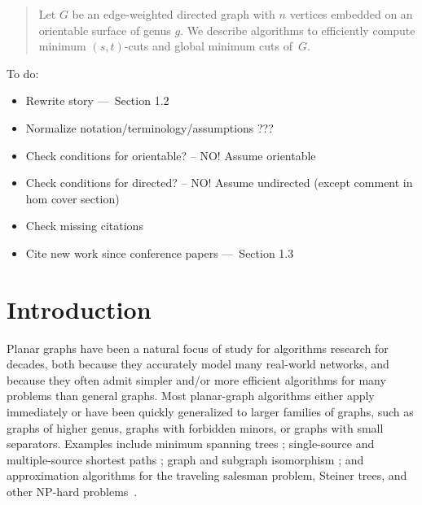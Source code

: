 \documentclass[11pt,twoside]{article}
\begin{document}
\begin{titlepage}
\begin{abstract}
Let $G$ be an edge-weighted directed graph with $n$ vertices embedded on an orientable surface of genus $g$.
We describe algorithms to efficiently compute minimum $(s,t)$-cuts and global minimum cuts of~$G$.
\end{abstract}


\bigskip
\begin{TODO}\noindent
To do:
\begin{itemize}\itemsep0pt
\item Rewrite story — Section 1.2
\item Normalize notation/terminology/assumptions ???
\item Check conditions for orientable? -- NO!  Assume orientable
\item Check conditions for directed? -- NO! Assume undirected (except comment in hom cover section)
\item Check missing citations
\item Cite new work since conference papers — Section 1.3
\end{itemize}
\end{TODO}

\noindent

\thispagestyle{empty}
\setcounter{page}{0}
\end{titlepage}


\section{Introduction}
\label{sec:intro}



Planar graphs have been a natural focus of study for algorithms research for decades, both because they accurately model many real-world networks, and because they often admit simpler and/or more efficient algorithms for many problems than general graphs.  Most planar-graph algorithms either apply immediately or have been quickly generalized to larger families of graphs, such as graphs of higher genus, graphs with forbidden minors, or graphs with small separators.  Examples include minimum spanning trees \cite{p-omst-99, m-tltam-04}; single-source and multiple-source shortest paths \cite{cc-msspg-07, fr-pgnwe-06, hkrs-fspap-97, k-msspp-05, kmw-spdpg-09, lrt-gnd-79, tm-spltm-09}; graph and subgraph isomorphism \cite{g-itegd-00, hw-ltaip-74, m-itgbg-80, e-sipgr-99, e-dtmcg-00}; and approximation algorithms for the traveling salesman problem, Steiner trees, and other NP-hard problems~\cite{bdt-ptass-08, bkk-ptass-07, bkk-stpg-07, dhm-aacd-07, e-dtmcg-00}.
\end{document}
